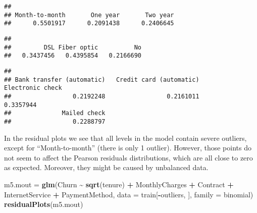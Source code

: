 \documentclass[
]{article}
\newenvironment{Shaded}{\begin{snugshade}}{\end{snugshade}}
\newcommand{\AttributeTok}[1]{\textcolor[rgb]{0.13,0.29,0.53}{#1}}
\newcommand{\CommentTok}[1]{\textcolor[rgb]{0.56,0.35,0.01}{\textit{#1}}}
\newcommand{\FunctionTok}[1]{\textcolor[rgb]{0.13,0.29,0.53}{\textbf{#1}}}
\newcommand{\NormalTok}[1]{#1}
\newcommand{\OtherTok}[1]{\textcolor[rgb]{0.56,0.35,0.01}{#1}}
\newcommand{\SpecialCharTok}[1]{\textcolor[rgb]{0.81,0.36,0.00}{\textbf{#1}}}
\begin{document}
\begin{Shaded}
\end{Shaded}

\begin{verbatim}
## 
## Month-to-month       One year       Two year 
##      0.5501917      0.2091438      0.2406645
\end{verbatim}

\begin{Shaded}
\end{Shaded}

\begin{verbatim}
## 
##         DSL Fiber optic          No 
##   0.3437456   0.4395854   0.2166690
\end{verbatim}

\begin{Shaded}
\end{Shaded}

\begin{verbatim}
## 
## Bank transfer (automatic)   Credit card (automatic)          Electronic check 
##                 0.2192248                 0.2161011                 0.3357944 
##              Mailed check 
##                 0.2288797
\end{verbatim}

In the residual plots we see that all levels in the model contain severe
outliers, except for ``Month-to-month'' (there is only 1 outlier).
However, those points do not seem to affect the Pearson residuals
distributions, which are all close to zero as expected. Moreover, they
might be caused by unbalanced data.

\begin{Shaded}
\begin{Highlighting}[]
\NormalTok{m5.mout }\OtherTok{=} \FunctionTok{glm}\NormalTok{(Churn }\SpecialCharTok{\textasciitilde{}} \FunctionTok{sqrt}\NormalTok{(tenure) }\SpecialCharTok{+}\NormalTok{ MonthlyCharges }\SpecialCharTok{+}\NormalTok{ Contract }\SpecialCharTok{+}
\NormalTok{    InternetService }\SpecialCharTok{+}\NormalTok{ PaymentMethod, }\AttributeTok{data =}\NormalTok{ train[}\SpecialCharTok{{-}}\NormalTok{outliers,}
\NormalTok{    ], }\AttributeTok{family =}\NormalTok{ binomial)}
\FunctionTok{residualPlots}\NormalTok{(m5.mout)}
\end{Highlighting}
\end{Shaded}
\end{document}
